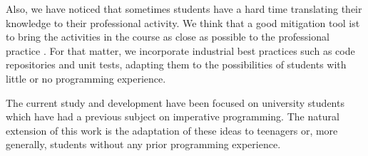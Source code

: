 Also, we have noticed that sometimes students
have a hard time translating their knowledge to their professional activity.
We think that a good mitigation tool ist to bring the activities in the course as close as possible to the professional practice \cite{McDermott2017AssessmentAuthenticity}.
For that matter, we incorporate industrial best practices such as code repositories and unit tests, 
adapting them to the possibilities of students with little or no programming experience.


The current study and development have been focused on university students which have had a previous subject on imperative programming.
The natural extension of this work is the adaptation of these ideas to teenagers or, more generally, students without any prior programming experience.

